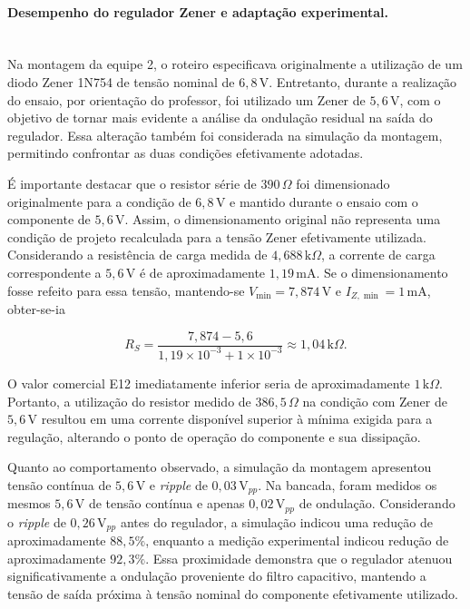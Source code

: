 \documentclass[11pt,a4paper]{article}
\begin{document}
\paragraph{Desempenho do regulador Zener e adaptação experimental.}\mbox{}\\

Na montagem da equipe 2, o roteiro especificava originalmente a utilização de um diodo Zener 1N754 de tensão nominal de $6{,}8\,\text{V}$. Entretanto, durante a realização do ensaio, por orientação do professor, foi utilizado um Zener de $5{,}6\,\text{V}$, com o objetivo de tornar mais evidente a análise da ondulação residual na saída do regulador. Essa alteração também foi considerada na simulação da montagem, permitindo confrontar as duas condições efetivamente adotadas.

É importante destacar que o resistor série de $390\,\Omega$ foi dimensionado originalmente para a condição de $6{,}8\,\text{V}$ e mantido durante o ensaio com o componente de $5{,}6\,\text{V}$. Assim, o dimensionamento original não representa uma condição de projeto recalculada para a tensão Zener efetivamente utilizada. Considerando a resistência de carga medida de $4{,}688\,\text{k}\Omega$, a corrente de carga correspondente a $5{,}6\,\text{V}$ é de aproximadamente $1{,}19\,\text{mA}$. Se o dimensionamento fosse refeito para essa tensão, mantendo-se $V_{\min}=7{,}874\,\text{V}$ e $I_{Z,\min}=1\,\text{mA}$, obter-se-ia

\[
R_S =
\frac{7{,}874-5{,}6}
{1{,}19\times10^{-3}+1\times10^{-3}}
\approx 1{,}04\,\text{k}\Omega.
\]

O valor comercial E12 imediatamente inferior seria de aproximadamente $1\,\text{k}\Omega$. Portanto, a utilização do resistor medido de $386{,}5\,\Omega$ na condição com Zener de $5{,}6\,\text{V}$ resultou em uma corrente disponível superior à mínima exigida para a regulação, alterando o ponto de operação do componente e sua dissipação.

Quanto ao comportamento observado, a simulação da montagem apresentou tensão contínua de $5{,}6\,\text{V}$ e \textit{ripple} de $0{,}03\,\text{V}_{pp}$. Na bancada, foram medidos os mesmos $5{,}6\,\text{V}$ de tensão contínua e apenas $0{,}02\,\text{V}_{pp}$ de ondulação. Considerando o \textit{ripple} de $0{,}26\,\text{V}_{pp}$ antes do regulador, a simulação indicou uma redução de aproximadamente $88{,}5\%$, enquanto a medição experimental indicou redução de aproximadamente $92{,}3\%$. Essa proximidade demonstra que o regulador atenuou significativamente a ondulação proveniente do filtro capacitivo, mantendo a tensão de saída próxima à tensão nominal do componente efetivamente utilizado.
\end{document}
